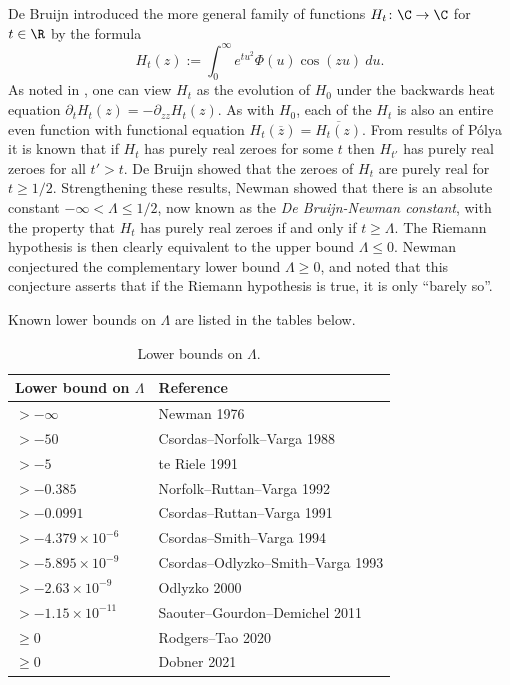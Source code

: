 De Bruijn \cite{debr} introduced the more general family of functions $H_t \colon \C \to \C$ for $t \in \R$ by the formula
\begin{equation}\label{htdef}
 H_t(z) := \int_0^\infty e^{tu^2} \Phi(u) \cos(zu)\ du.
\end{equation}
As noted in \cite[p.114]{csv}, one can view $H_t$ as the evolution of $H_0$ under the backwards heat equation $\partial_t H_t(z)= -\partial_{zz} H_t(z)$.
As with $H_0$, each of the $H_t$ is also an entire even function with functional equation $H_t(\overline{z}) = \overline{H_t(z)}$.  From results of P\'olya \cite{polya} it is known that if $H_t$ has purely real zeroes for some $t$ then $H_{t'}$ has purely real zeroes for all $t'>t$.
De Bruijn showed that the zeroes of $H_t$ are purely real for $t \geq 1/2$.  Strengthening these results, Newman \cite{newman} showed that there is an absolute constant $-\infty < \Lambda \leq 1/2$, now known as the \emph{De Bruijn-Newman constant}, with the property that $H_t$ has purely real zeroes if and only if $t \geq \Lambda$.  The Riemann hypothesis is then clearly equivalent to the upper bound $\Lambda \leq 0$.  Newman conjectured the complementary lower bound $\Lambda \geq 0$, and noted that this conjecture asserts that if the Riemann hypothesis is true, it is only ``barely so''.

Known lower bounds on $\Lambda$ are listed in the tables below.

\begin{table}[ht]
  \caption{Lower bounds on $\Lambda$.}
  \begin{tabular}{|l|l|}
  \hline
  Lower bound on $\Lambda$ & Reference \\
  \hline
  $>-\infty$ & Newman 1976 \cite{newman} \\
  $>-50$ & Csordas--Norfolk--Varga 1988 \cite{cnv} \\
  $>-5$ & te Riele 1991 \cite{tr} \\
  $>-0.385$ & Norfolk--Ruttan--Varga 1992 \cite{nrv} \\
  $>-0.0991$ & Csordas--Ruttan--Varga 1991 \cite{csordas_laguerre_1991} \\
  \hline
  $>-4.379 \times 10^{-6}$ & Csordas--Smith--Varga 1994 \cite{csv} \\
  $>-5.895 \times 10^{-9}$ & Csordas--Odlyzko--Smith--Varga 1993 \cite{cosv} \\
  $>-2.63 \times 10^{-9}$ & Odlyzko 2000 \cite{odlyzko} \\
  $>-1.15 \times 10^{-11}$ & Saouter--Gourdon--Demichel 2011 \cite{saouter} \\
  \hline
  $\geq 0$ & Rodgers--Tao 2020 \cite{rodgers-tao} \\
  $\geq 0$ & Dobner 2021 \cite{dobner} \\
  \hline
  \end{tabular}
  \end{table}

